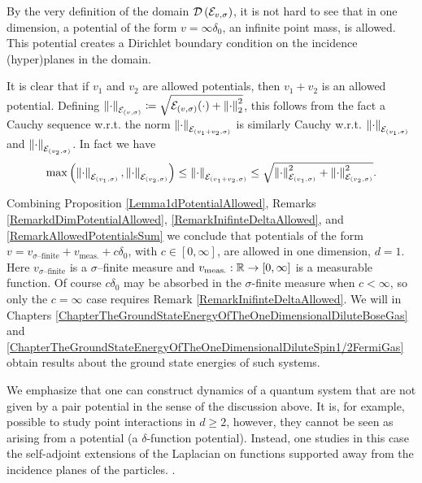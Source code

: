 \begin{remark}\label{RemarkInifinteDeltaAllowed}
	By the very definition of the domain $ \mathcal D\left(\mathcal{E}_{v,\sigma}\right) $, it is not hard to see that in one dimension, a potential of the form $ v=\infty\delta_0 $, \ie an infinite point mass, is allowed. This potential creates a Dirichlet boundary condition on the incidence (hyper)planes in the domain.
\end{remark}
\begin{remark}\label{RemarkAllowedPotentialsSum}
	It is clear that if $ v_1 $ and $ v_2 $ are allowed potentials, then $ v_1+v_2 $ is an allowed potential. Defining $ \left\lVert \cdot \right\rVert_{\mathcal{E}_{(v,\sigma)}}\coloneqq\sqrt{\mathcal{E}_{(v,\sigma)}(\cdot)+\left\lVert \cdot \right\rVert_2^2} $, this follows from the fact a Cauchy sequence w.r.t. the norm $ \left\lVert \cdot \right\rVert_{\mathcal{E}_{(v_1+v_2,\sigma)}} $ is similarly Cauchy w.r.t. $ \left\lVert \cdot \right\rVert_{\mathcal{E}_{(v_{1},\sigma)}} $ and $ \left\lVert \cdot \right\rVert_{\mathcal{E}_{(v_2,\sigma)}} $. In fact we have $$ \max\left(\left\lVert \cdot \right\rVert_{\mathcal{E}_{(v_1,\sigma)}},\left\lVert \cdot \right\rVert_{\mathcal{E}_{(v_2,\sigma)}}\right)\leq \left\lVert \cdot \right\rVert_{\mathcal{E}_{(v_1+v_2,\sigma)}}\leq \sqrt{\left\lVert \cdot \right\rVert_{\mathcal{E}_{(v_1,\sigma)}}^2+\left\lVert \cdot \right\rVert_{\mathcal{E}_{(v_2,\sigma)}}^2}. $$
\end{remark}
\begin{remark}
	Combining Proposition \ref{Lemma1dPotentialAllowed}, Remarks \ref{RemarkdDimPotentialAllowed}, \ref{RemarkInifinteDeltaAllowed}, and \ref{RemarkAllowedPotentialsSum} we conclude that potentials of the form $ v=v_{\sigma\text{--finite}}+v_{\text{meas.}}+c\delta_0 $, with $ c\in[0,\infty] $, are allowed in one dimension, $ d=1 $. Here $ v_{\sigma\text{--finite}} $ is a $ \sigma $--finite measure and $ v_{\text{meas.}}:\mathbb{R} \to[0,\infty] $ is a measurable function. Of course $ c\delta_0 $ may be absorbed in the $ \sigma $-finite measure when $ c<\infty $, so only the $ c=\infty $ case requires Remark \ref{RemarkInifinteDeltaAllowed}.
	 We will in Chapters \ref{ChapterTheGroundStateEnergyOfTheOneDimensionalDiluteBoseGas} and \ref{ChapterTheGroundStateEnergyOfTheOneDimensionalDiluteSpin1/2FermiGas} obtain results about the ground state energies of such systems.
\end{remark}
\begin{remark}
	We emphasize that one can construct dynamics of a quantum system that are not given by a pair potential in the sense of the discussion above. It is, for example, possible to study point interactions in $ d\geq 2 $, however, they cannot be seen as arising from a potential (\eg a $ \delta $-function potential). Instead, one studies in this case the self-adjoint extensions of the Laplacian on functions supported away from the incidence planes of the particles. \cite{albeverio2012solvable}.
\end{remark}


